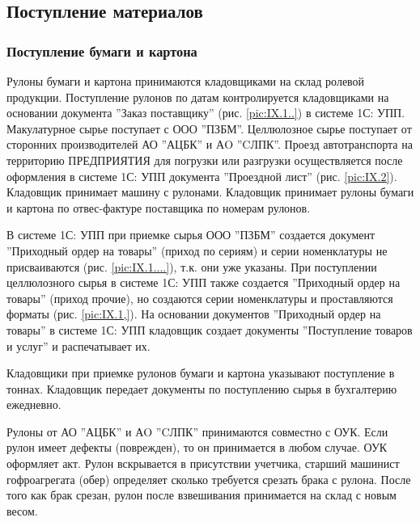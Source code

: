 \newpage
\subsection{Поступление материалов}
\label{bp:MatInput}
%


\subsubsection{Поступление бумаги и картона}

Рулоны бумаги и картона принимаются кладовщиками на склад ролевой продукции. Поступление рулонов по датам контролируется кладовщиками на основании документа ''Заказ поставщику'' (рис. \ref{pic:IX.1..}) в системе 1С: УПП. Макулатурное сырье поступает с ООО ''ПЗБМ''. Целлюлозное сырье поступает от сторонних производителей АО ''АЦБК'' и  АO ''CЛПК''.
Проезд автотранспорта на территорию ПРЕДПРИЯТИЯ для погрузки или разгрузки осуществляется после оформления в системе 1С: УПП документа ''Проездной лист'' (рис. \ref{pic:IX.2}).
Кладовщик принимает машину с рулонами. Кладовщик принимает рулоны бумаги и картона по отвес-фактуре поставщика по номерам рулонов.  

В системе 1С: УПП при приемке сырья ООО ''ПЗБМ'' создается документ ''Приходный ордер на товары'' (приход по сериям) и серии номенклатуры не присваиваются (рис. \ref{pic:IX.1....}), т.к. они уже указаны. При поступлении целлюлозного сырья в системе 1С: УПП также создается ''Приходный ордер на товары'' (приход прочие), но создаются серии номенклатуры и проставляются форматы (рис. \ref{pic:IX.1,}).
На основании документов ''Приходный ордер на товары''  в системе 1С: УПП кладовщик создает документы ''Поступление товаров и услуг'' и распечатывает их. 



Кладовщики при приемке рулонов бумаги и картона указывают поступление в тоннах.
Кладовщик передает документы по поступлению сырья в бухгалтерию ежедневно.

Рулоны от  АО ''АЦБК'' и  АO ''CЛПК'' принимаются совместно с ОУК. Если рулон имеет дефекты (поврежден), то он принимается в любом случае. ОУК оформляет акт. Рулон вскрывается в присутствии учетчика, старший машинист гофроагрегата (обер) определяет сколько требуется срезать брака с рулона. После того как брак срезан, рулон после взвешивания принимается на склад с новым весом. 

